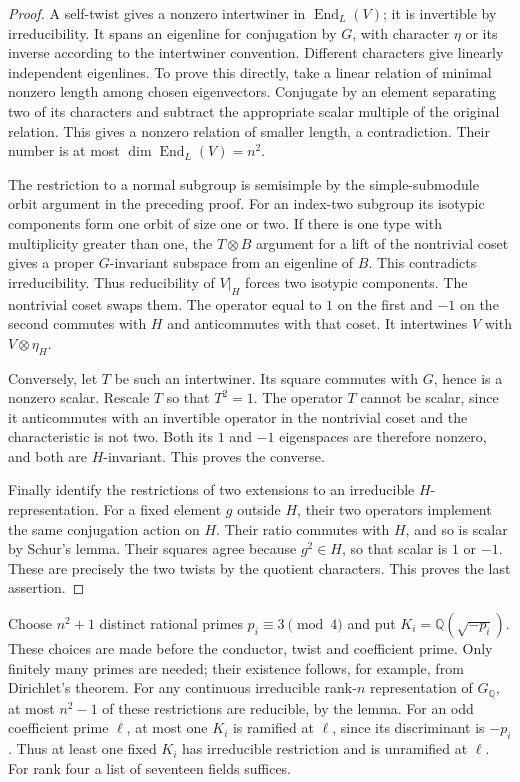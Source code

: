 \begin{proof}
A self-twist gives a nonzero intertwiner in \(\operatorname{End}_L(V)\);
it is invertible by irreducibility.
It spans an eigenline for conjugation by \(G\), with character
\(\eta\) or its inverse according to the intertwiner convention.
Different characters give linearly independent eigenlines.
To prove this directly, take a linear relation of minimal
nonzero length among chosen eigenvectors. Conjugate by an element
separating two of its characters and subtract the appropriate
scalar multiple of the original relation. This gives a nonzero
relation of smaller length, a contradiction.
Their number is at most \(\dim\operatorname{End}_L(V)=n^2\).

The restriction to a normal subgroup is semisimple by the
simple-submodule orbit argument in the preceding proof.
For an index-two subgroup its isotypic components form one orbit
of size one or two.
If there is one type with multiplicity greater than one,
the \(T\otimes B\) argument for a lift of the nontrivial coset
gives a proper \(G\)-invariant subspace from an eigenline of \(B\).
This contradicts irreducibility.
Thus reducibility of \(V|_H\) forces two isotypic components.
The nontrivial coset swaps them.
The operator equal to \(1\) on the first and \(-1\) on the second
commutes with \(H\) and anticommutes with that coset.
It intertwines \(V\) with \(V\otimes\eta_H\).

Conversely, let \(T\) be such an intertwiner.
Its square commutes with \(G\), hence is a nonzero scalar.
Rescale \(T\) so that \(T^2=1\).
The operator \(T\) cannot be scalar, since it anticommutes with an
invertible operator in the nontrivial coset and the characteristic
is not two.
Both its \(1\) and \(-1\) eigenspaces are therefore nonzero,
and both are \(H\)-invariant. This proves the converse.

Finally identify the restrictions of two extensions to an
irreducible \(H\)-representation.
For a fixed element \(g\) outside \(H\), their two operators
implement the same conjugation action on \(H\).
Their ratio commutes with \(H\), and so is scalar by Schur's lemma.
Their squares agree because \(g^2\in H\), so that scalar is \(1\)
or \(-1\). These are precisely the two twists by the quotient
characters. This proves the last assertion.
\end{proof}

Choose \(n^2+1\) distinct rational primes \(p_i\equiv3\pmod4\)
and put \(K_i=\mathbb Q(\sqrt{-p_i})\).
These choices are made before the conductor, twist and coefficient
prime. Only finitely many primes are needed; their existence follows,
for example, from Dirichlet's theorem.
For any continuous irreducible rank-\(n\) representation of
\(G_{\mathbb Q}\), at most \(n^2-1\) of these restrictions are
reducible, by the lemma.
For an odd coefficient prime \(\ell\), at most one \(K_i\) is
ramified at \(\ell\), since its discriminant is \(-p_i\).
Thus at least one fixed \(K_i\) has irreducible restriction and
is unramified at \(\ell\).
For rank four a list of seventeen fields suffices.

